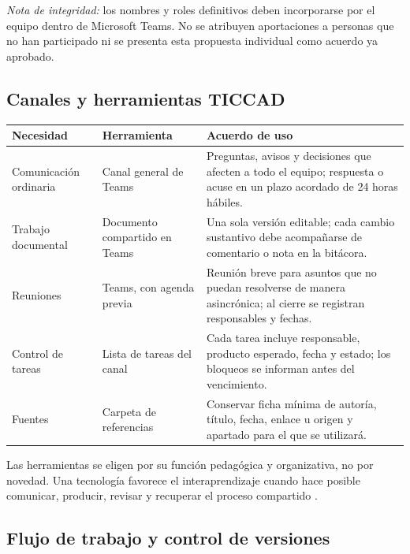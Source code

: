 \documentclass[
  spanish,
  letterpaper, oneside
]{article}
\begin{document}
\textit{Nota de integridad:} los nombres y roles definitivos deben incorporarse por
el equipo dentro de Microsoft Teams. No se atribuyen aportaciones a personas que no
han participado ni se presenta esta propuesta individual como acuerdo ya aprobado.

\subsection{Canales y herramientas TICCAD}

\begin{longtable}{p{3.1cm}p{4.2cm}p{6.1cm}}
\toprule
\textbf{Necesidad} & \textbf{Herramienta} & \textbf{Acuerdo de uso} \\
\midrule
Comunicación ordinaria & Canal general de Teams & Preguntas, avisos y decisiones que afecten a todo el equipo; respuesta o acuse en un plazo acordado de 24 horas hábiles. \\
Trabajo documental & Documento compartido en Teams & Una sola versión editable; cada cambio sustantivo debe acompañarse de comentario o nota en la bitácora. \\
Reuniones & Teams, con agenda previa & Reunión breve para asuntos que no puedan resolverse de manera asincrónica; al cierre se registran responsables y fechas. \\
Control de tareas & Lista de tareas del canal & Cada tarea incluye responsable, producto esperado, fecha y estado; los bloqueos se informan antes del vencimiento. \\
Fuentes & Carpeta de referencias & Conservar ficha mínima de autoría, título, fecha, enlace u origen y apartado para el que se utilizará. \\
\bottomrule
\end{longtable}

Las herramientas se eligen por su función pedagógica y organizativa, no por novedad.
Una tecnología favorece el interaprendizaje cuando hace posible comunicar, producir,
revisar y recuperar el proceso compartido \citep{cushpa2022pacie,zambranoPilay2020tecnologias}.

\subsection{Flujo de trabajo y control de versiones}
\end{document}
